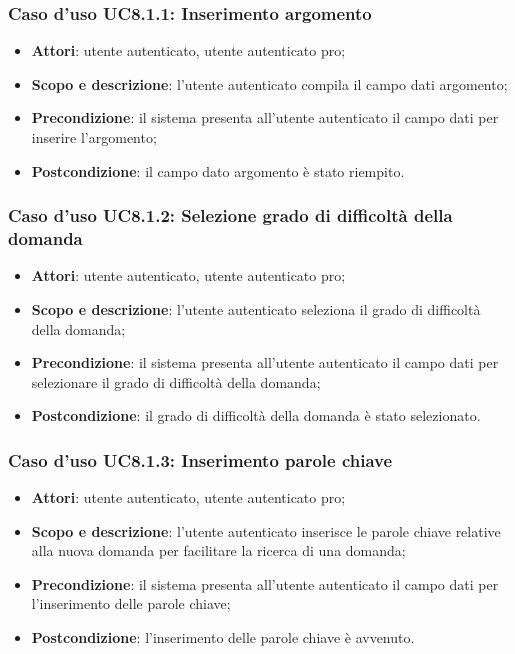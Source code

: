 	\subsubsection{Caso d'uso UC8.1.1: Inserimento argomento}
	\begin{itemize}
		\item
			\textbf{Attori}: utente autenticato, utente autenticato pro;
		\item
			\textbf{Scopo e descrizione}: l'utente autenticato compila il campo dati argomento;
		\item		
			\textbf{Precondizione}: il sistema presenta all'utente autenticato il campo dati per inserire l'argomento;
		\item
			\textbf{Postcondizione}: il campo dato argomento è stato riempito.
	\end{itemize}	
	\subsubsection{Caso d'uso UC8.1.2: Selezione grado di difficoltà della domanda}
	\begin{itemize}
		\item
			\textbf{Attori}: utente autenticato, utente autenticato pro;
		\item
			\textbf{Scopo e descrizione}: l'utente autenticato seleziona il grado di difficoltà della domanda;
		\item		
			\textbf{Precondizione}: il sistema presenta all'utente autenticato il campo dati per selezionare il grado di difficoltà della domanda;
		\item
			\textbf{Postcondizione}: il grado di difficoltà della domanda è stato selezionato.
	\end{itemize}	
	\subsubsection{Caso d'uso UC8.1.3: Inserimento parole chiave}
	\begin{itemize}
		\item
			\textbf{Attori}: utente autenticato, utente autenticato pro;
		\item
			\textbf{Scopo e descrizione}: l'utente autenticato inserisce le parole chiave relative alla nuova domanda per facilitare la ricerca di una domanda;
		\item		
			\textbf{Precondizione}: il sistema presenta all'utente autenticato il campo dati per l'inserimento delle parole chiave;
		\item
			\textbf{Postcondizione}: l'inserimento delle parole chiave è avvenuto.
	\end{itemize}
